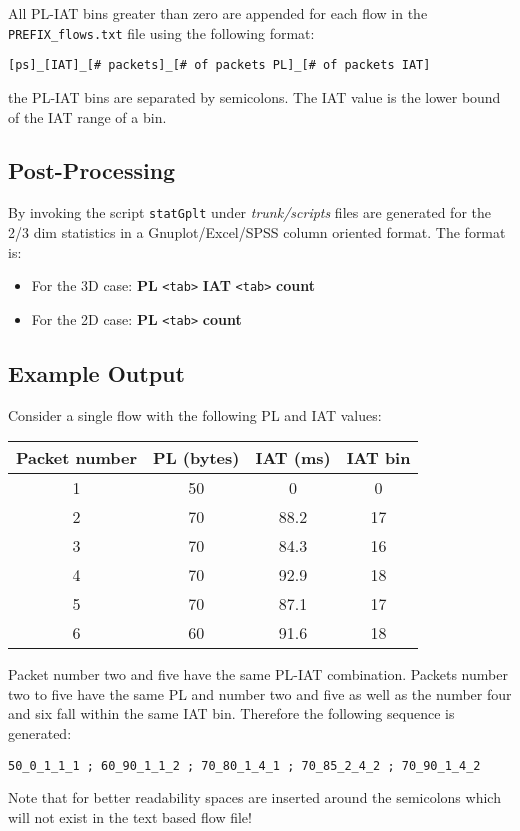 \documentclass[documentation]{subfiles}
\begin{document}
All PL-IAT bins greater than zero are appended for each flow in the {\tt PREFIX\_flows.txt} file using the
following format:
\begin{center}
    {\tt [ps]\_[IAT]\_[\# packets]\_[\# of packets PL]\_[\# of packets IAT]}
\end{center}
the PL-IAT bins are separated by semicolons. The IAT value is the lower bound of the IAT range of a bin.

\subsection{Post-Processing}
By invoking the script {\tt statGplt} under {\em trunk/scripts} files are generated for the 2/3 dim statistics in a Gnuplot/Excel/SPSS column oriented format. The format is:
\begin{itemize}
    \item For the 3D case: {\bf PL} {\tt <tab>} {\bf IAT} {\tt <tab>} {\bf count}
    \item For the 2D case: {\bf PL} {\tt <tab>} {\bf count}
\end{itemize}

\subsection{Example Output}
Consider a single flow with the following PL and IAT values:
\begin{center}
    \begin{tabular}{cccc}
        \toprule
        {\bf Packet number} & {\bf PL (bytes)} & {\bf IAT (ms)} & {\bf IAT bin}\\
        \midrule
        1 & 50 & 0    &  0 \\
        2 & 70 & 88.2 & 17 \\
        3 & 70 & 84.3 & 16 \\
        4 & 70 & 92.9 & 18 \\
        5 & 70 & 87.1 & 17 \\
        6 & 60 & 91.6 & 18 \\
        \bottomrule
    \end{tabular}
\end{center}
Packet number two and five have the same PL-IAT combination. Packets number two to five have the same PL and number two and five as well as the number four and six fall within the same IAT bin. Therefore the following sequence is generated:
\begin{center}
    {\tt 50\_0\_1\_1\_1 ; 60\_90\_1\_1\_2 ; 70\_80\_1\_4\_1 ; 70\_85\_2\_4\_2 ; 70\_90\_1\_4\_2}
\end{center}
Note that for better readability spaces are inserted around the semicolons which will not exist in the text based flow file!
\end{document}
